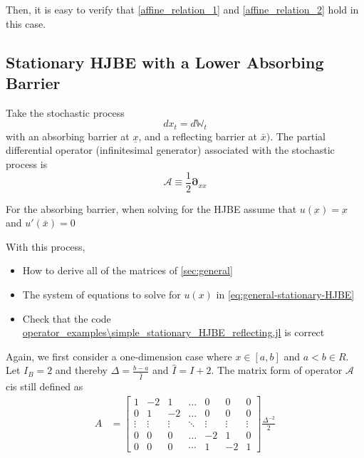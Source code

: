 \documentclass[11pt]{article}
\newcommand{\D}[1][]{\ensuremath{\boldsymbol{\partial}_{#1}}}
\newcommand{\W}{\ensuremath{\mathbb{W}}}
\newcommand{\A}{\ensuremath{\mathcal{A}}}
\begin{document}
Then, it is easy to verify that \eqref{affine_relation_1} and \eqref{affine_relation_2} hold in this case.

\subsection{Stationary HJBE with a Lower Absorbing Barrier}
Take the stochastic process
$$
d x_t = d \W_t
$$
with an absorbing barrier at $\underline{x}$, and a reflecting barrier at $\bar{x})$.  The partial differential operator (infinitesimal generator) associated with the stochastic process is
$$
\A \equiv \frac{1}{2}\D[xx]
$$

For the absorbing barrier, when solving for the HJBE assume that $u(\underbar{x}) = \underbar{x}$ and $u'(\bar{x}) = 0$


With this process,
\begin{itemize}
	\item How to derive all of the matrices of \cref{sec:general}
	\item The system of equations to solve for $u(x)$ in \cref{eq:general-stationary-HJBE}
	\item Check that the code \url{operator_examples\simple_stationary_HJBE_reflecting.jl} is correct
\end{itemize}

Again, we first consider a one-dimension case where $x\in [a, b]$ and $a<b \in R$. Let $I_B = 2$ and thereby $\Delta  = \frac{b-a}{\hat{I}}$ and $\hat{I} = I+2$. The matrix form of operator $\A$ cis still defined as
\begin{align}
A &= \begin{bmatrix}
1&-2&1&\dots&0&0&0\\
0&1&-2&\dots&0&0&0\\
\vdots&\vdots&\vdots&\ddots&\vdots&\vdots&\vdots\\
0&0&0&\dots&-2&1&0\\
0&0&0&\cdots&1&-2&1
\end{bmatrix}\frac{\Delta^{-2}}{2}\nonumber
\end{align}
\end{document}
